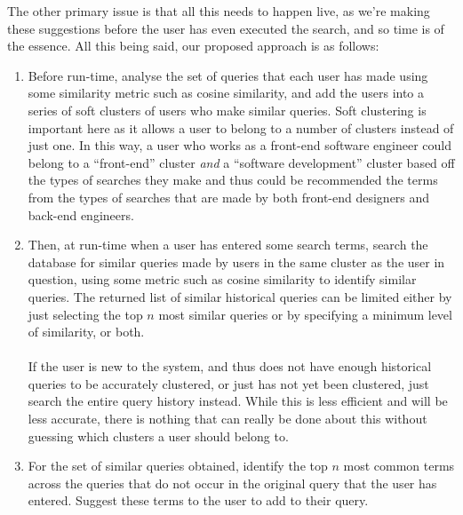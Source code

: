 \documentclass[a4paper]{article}
\begin{document}
The other primary issue is that all this needs to happen live, as we're making these suggestions before the user has even executed the search, and so time is of the essence.
All this being said, our proposed approach is as follows:
\begin{enumerate}
    \item   Before run-time, analyse the set of queries that each user has made using some similarity metric such as cosine similarity, and add the users into a series of soft clusters of users who make similar queries.
        Soft clustering is important here as it allows a user to belong to a number of clusters instead of just one.
        In this way, a user who works as a front-end software engineer could belong to a ``front-end'' cluster \textit{and} a ``software development'' cluster based off the types of searches they make and thus could be recommended the terms from the types of searches that are made by both front-end designers and back-end engineers.

    \item   Then, at run-time when a user has entered some search terms, search the database for similar queries made by users in the same cluster as the user in question, using some metric such as cosine similarity to identify similar queries.
            The returned list of similar historical queries can be limited either by just selecting the top $n$ most similar queries or by specifying a minimum level of similarity, or both.
            \\\\
            If the user is new to the system, and thus does not have enough historical queries to be accurately clustered, or just has not yet been clustered, just search the entire query history instead.
            While this is less efficient and will be less accurate, there is nothing that can really be done about this without guessing which clusters a user should belong to.

    \item   For the set of similar queries obtained, identify the top $n$ most common terms across the queries that do not occur in the original query that the user has entered.
            Suggest these terms to the user to add to their query.
\end{enumerate}
\end{document}
